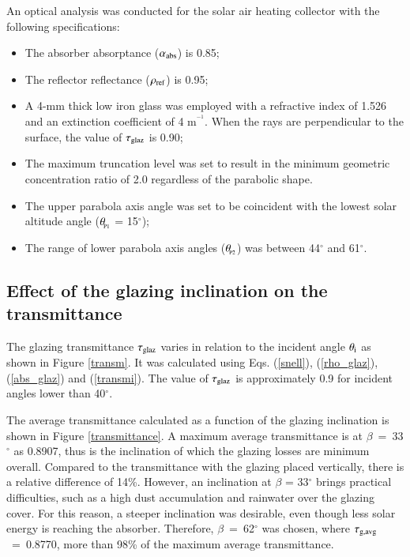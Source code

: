 
An optical analysis was conducted for the solar air heating collector with the following specifications:

\begin{itemize} [topsep=5pt,partopsep=0pt] \itemsep0pt
    \item The absorber absorptance ($\alpha_{\rm{abs}}$) is 0.85;
    \item The reflector reflectance ($\rho_{\rm{ref}}$) is 0.95;
    \item A 4-mm thick low iron glass was employed with a refractive index of 1.526 and an extinction coefficient of 4 m$^{\!^{-1}}$. When the rays are perpendicular to the surface, the value of $\tau_{\rm{glaz}}$ is 0.90;
    \item The maximum truncation level was set to result in the minimum geometric concentration ratio of 2.0 regardless of the parabolic shape.
    \item The upper parabola axis angle was set to be coincident with the lowest solar altitude angle ($\theta_{\!_{\rm{P1}}}$ = 15$^{\circ}$);
    \item The range of lower parabola axis angles ($\theta_{\!_{\rm{P2}}}$) was between 44$^{\circ}$ and 61$^{\circ}$.
\end{itemize}

\subsection{Effect of the glazing inclination on the transmittance}

The glazing transmittance $\tau_{\rm{glaz}}$ varies in relation to the incident angle $\theta_{\rm{i}}$ as shown in Figure \ref{transm}. It was calculated using Eqs. (\ref{snell}), (\ref{rho_glaz}), (\ref{abs_glaz}) and (\ref{transmi}). The value of $\tau_{\rm{glaz}}$ is approximately 0.9 for incident angles lower than 40$^{\circ}$.


\newpage
The average transmittance calculated as a function of the glazing inclination is shown in Figure \ref{transmittance}. A maximum average transmittance is at \mbox{$\beta$ = 33$^{\circ}$} as 0.8907, thus is the inclination of which the glazing losses are minimum overall. Compared to the transmittance with the glazing placed vertically, there is a relative difference of 14\%. However, an inclination at $\beta$ = 33$^{\circ}$ brings practical difficulties, such as a high dust accumulation and rainwater over the glazing cover. For this reason, a steeper inclination was desirable, even though less solar energy is reaching the absorber. Therefore, \mbox{$\beta$ = 62$^{\circ}$} was chosen, where \mbox{$\tau_{\rm{g,avg}}$ = 0.8770}, more than 98\% of the maximum average transmittance.

